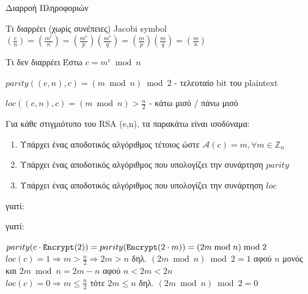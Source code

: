 \documentclass[handout]{beamer}
\begin{document}
\begin{frame}[allowframebreaks]{Διαρροή Πληροφοριών}
\begin{block}{Τι διαρρέει (χωρίς συνέπειες)}
Jacobi symbol
$(\frac{c}{n}) = (\frac{m^e}{n}) = (\frac{m^e}{p}) (\frac{m^e}{q}) =  (\frac{m}{p}) (\frac{m}{q}) = (\frac{m}{n}) $
\end{block}

\begin{block}{Τι δεν διαρρέει}
Έστω $c = m^e \bmod{n}$

$parity((e,n), c) = (m \bmod n) \bmod 2$ - τελευταίο bit του plaintext

$loc((e,n), c) = (m \bmod n) > \frac{n}{2}$ - κάτω μισό / πάνω μισό
\end{block}
\begin{small}

\framebreak

\begin{block}{}
Για κάθε στιγμιότυπο του RSA (e,n), τα παρακάτω είναι ισοδύναμα:
\begin{enumerate}
\item  Υπάρχει ένας αποδοτικός αλγόριθμος \adv τέτοιος ώστε  $\mathcal{A}(c)  = m, \forall m \in \mathbb{Z}_n$ 
\item  Υπάρχει ένας αποδοτικός αλγόριθμος που υπολογίζει την συνάρτηση $parity$
\item  Υπάρχει ένας αποδοτικός αλγόριθμος που υπολογίζει την συνάρτηση $loc$
\end{enumerate}
\end{block}
\end{small}

\framebreak


 
 γιατί:

\framebreak

 
 γιατί:

$parity( c \cdot \mathtt{Encrypt}(2)) = parity( \mathtt{Encrypt}(2 \cdot m)) = (2m \bmod n) \bmod 2$
\medskip\\

$loc(c)=1 \Rightarrow m > \frac{n}{2} \Rightarrow 2m > n$ δηλ. $(2m \bmod n) \bmod 2 = 1$ αφού $n$ μονός \\και $2m \bmod n = 2m - n$ αφού $n < 2m <2n$\\
\medskip
$loc(c)=0 \Rightarrow m \leq \frac{n}{2}$ τότε $2m \leq n$ δηλ. $(2m \bmod n) \bmod 2 = 0$  


\end{frame}
\end{document}
